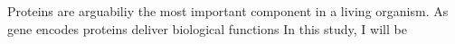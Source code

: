 Proteins are arguabiliy the most important component in a living organism. As gene encodes proteins deliver biological functions   In this study, I will be 
